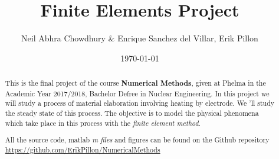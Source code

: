\documentclass{article}
\begin{document}
\date{\today}
\author{Neil Abhra Chowdhury \& Enrique Sanchez del Villar, Erik Pillon}
\title{Finite Elements Project}
\maketitle
\begin{abstract}
	This is the final project of the course \textbf{Numerical Methods}, given at Phelma in the Academic Year 2017/2018, Bachelor Defree in Nuclear Engineering. In this project we will study a process of material elaboration involving heating by electrode. We 'll study the steady state of this process. The objective is to model the physical phenomena which take place in this process with the \emph{finite element method}.
	
	All the source code, matlab \textit{m files} and figures can be found on the Github repository \url{https://github.com/ErikPillon/NumericalMethods}
\end{abstract}






\end{document}
